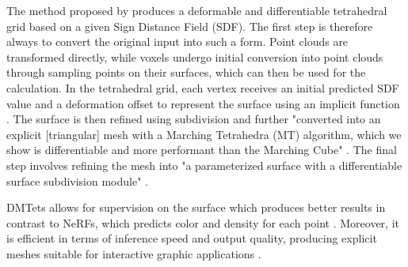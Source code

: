 The method proposed by \citeauthor{shen2021DMTet} produces a deformable and differentiable tetrahedral grid based on a given Sign Distance Field (SDF). The first step is therefore always to convert the original input into such a form. Point clouds are transformed directly, while voxels undergo initial conversion into point clouds through sampling points on their surfaces, which can then be used for the calculation. In the tetrahedral grid, each vertex receives an initial predicted SDF value and a deformation offset to represent the surface using an implicit function \citep{shen2021DMTet}. The surface is then refined using subdivision and further "converted into an explicit [triangular] mesh with a Marching Tetrahedra (MT) algorithm, which we show is differentiable and more performant than the Marching Cube" \citep{shen2021DMTet}. The final step involves refining the mesh into "a parameterized surface with a differentiable surface subdivision module" \citep{shen2021DMTet}.

DMTets allows for supervision on the surface which produces better results in contrast to NeRFs, which predicts color and density for each point \citep{shen2021DMTet}. Moreover, it is efficient in terms of inference speed and output quality, producing explicit meshes suitable for interactive graphic applications \citep{shen2021DMTet}.